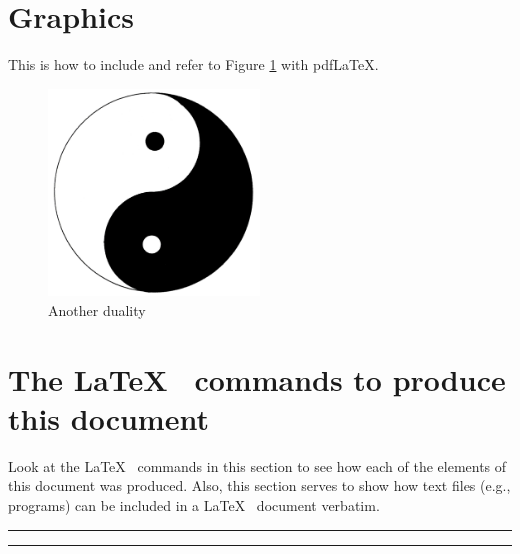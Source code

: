 \documentclass{amsart}
\theoremstyle{definition}
\theoremstyle{remark}
\numberwithin{equation}{section}
\begin{document}
\section{Graphics}

This is how to include and refer to Figure \ref{nameoffigure} with pdfLaTeX.

\begin{figure}[h!!]
\includegraphics[width=0.5\textwidth]{yinyang.jpg}
\caption{Another duality}\label{nameoffigure}
\end{figure}

\section{The \LaTeX~ commands to produce this document}
\label{sec:appendix}

Look at the \LaTeX~ commands in this section to see how each of the elements 
of this document was produced. Also, this section serves to show
how text files (e.g., programs) can be included in a \LaTeX~ document verbatim.

\bigskip

\hrule

\small

\normalsize

\hrule

\bigskip

\end{document}
